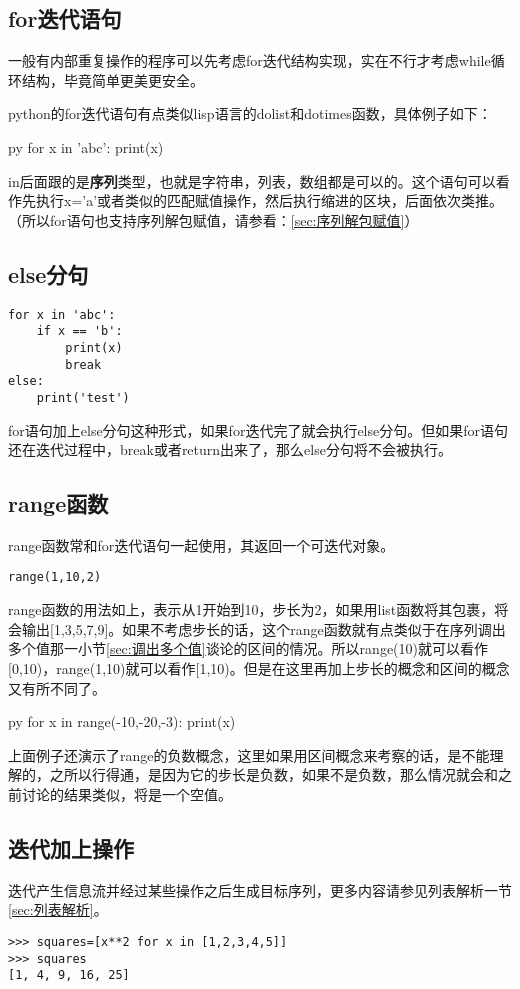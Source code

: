 \documentclass[12pt,oneside]{book}
\begin{document}
\begin{common-format}
\section{for迭代语句}
一般有内部重复操作的程序可以先考虑for迭代结构实现，实在不行才考虑while循环结构，毕竟简单更美更安全。

python的for迭代语句有点类似lisp语言的dolist和dotimes函数，具体例子如下：
\begin{xverbatim}[129]{py}
for x in 'abc':
    print(x)
\end{xverbatim}
in后面跟的是\textbf{序列}类型，也就是字符串，列表，数组都是可以的。这个语句可以看作先执行x='a'或者类似的匹配赋值操作，然后执行缩进的区块，后面依次类推。（所以for语句也支持序列解包赋值，请参看：\ref{sec:序列解包赋值}）

\subsection{else分句}
\begin{Verbatim}
for x in 'abc':
    if x == 'b':
        print(x)
        break
else:
    print('test')
\end{Verbatim}

for语句加上else分句这种形式，如果for迭代完了就会执行else分句。但如果for语句还在迭代过程中，break或者return出来了，那么else分句将不会被执行。


\subsection{range函数}
range函数常和for迭代语句一起使用，其返回一个可迭代对象。

\begin{Verbatim}
range(1,10,2)
\end{Verbatim}

range函数的用法如上，表示从1开始到10，步长为2，如果用list函数将其包裹，将会输出[1,3,5,7,9]。如果不考虑步长的话，这个range函数就有点类似于在序列调出多个值那一小节\ref{sec:调出多个值}谈论的区间的情况。所以range(10)就可以看作[0,10)，range(1,10)就可以看作[1,10)。但是在这里再加上步长的概念和区间的概念又有所不同了。

\begin{xverbatim}[129]{py}
for x in range(-10,-20,-3):
    print(x)
\end{xverbatim}
上面例子还演示了range的负数概念，这里如果用区间概念来考察的话，是不能理解的，之所以行得通，是因为它的步长是负数，如果不是负数，那么情况就会和之前讨论的结果类似，将是一个空值。


\subsection{迭代加上操作}
迭代产生信息流并经过某些操作之后生成目标序列，更多内容请参见列表解析一节\ref{sec:列表解析}。
\begin{Verbatim}
>>> squares=[x**2 for x in [1,2,3,4,5]]
>>> squares
[1, 4, 9, 16, 25]
\end{Verbatim}



\end{common-format}
\end{document}
